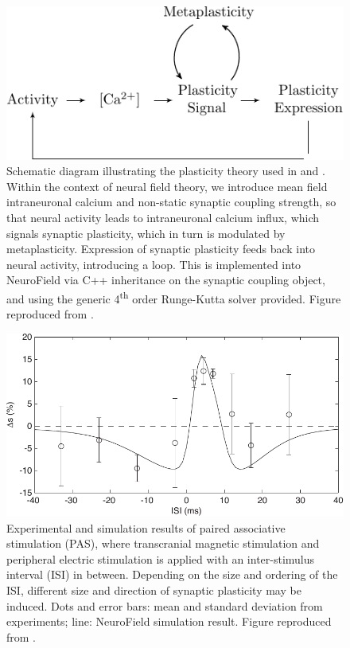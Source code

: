 \documentclass[preprint,review,10pt,authoryear,letterpaper]{elsarticle}
\begin{document}
\begin{figure}[t]
\begin{center}
\includegraphics[width=.7\textwidth]{bcm-schematic}
\caption{Schematic diagram illustrating the plasticity theory used in \citet{fung13} and \citet{fung14}. Within the context of neural field theory, we introduce mean field intraneuronal calcium and non-static synaptic coupling strength, so that neural activity leads to intraneuronal calcium influx, which signals synaptic plasticity, which in turn is modulated by metaplasticity. Expression of synaptic plasticity feeds back into neural activity, introducing a loop. This is implemented into NeuroField via C++ inheritance on the synaptic coupling object, and using the generic 4\textsuperscript{th} order Runge-Kutta solver provided. Figure reproduced from \citet{fung14}.}
\label{fig:cadp}
\end{center}
\end{figure}

\begin{figure}[t]
\begin{center}
\includegraphics[width=.8\textwidth]{window}
\caption{Experimental and simulation results of paired associative stimulation (PAS), where transcranial magnetic stimulation and peripheral electric stimulation is applied with an inter-stimulus interval (ISI) in between. Depending on the size and ordering of the ISI, different size and direction of synaptic plasticity may be induced. Dots and error bars: mean and standard deviation from experiments; line: NeuroField simulation result. Figure reproduced from \citet{fung13}.}
\label{fig:cadp-window}
\end{center}
\end{figure}
\end{document}
